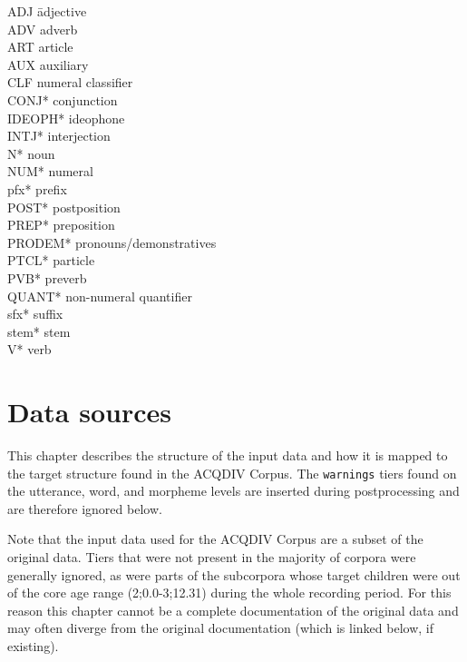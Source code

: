 \documentclass[a4paper, 11pt]{book}
\begin{document}
\begin{multicols}{2}
	\begin{tabbing}
	ADJ \hspace{2cm} \= adjective \\
	ADV \> adverb \\
	ART \> article \\
	AUX \> auxiliary \\
	CLF \> numeral classifier \\
	CONJ* \> conjunction \\
	IDEOPH* \> ideophone \\
	INTJ* \> interjection \\
	N* \> noun \\
	NUM* \> numeral \\
	pfx* \> prefix \\
	POST* \> postposition \\
	PREP* \> preposition \\
	PRODEM* \> pronouns/demonstratives \\
	PTCL* \> particle \\
	PVB* \> preverb \\
	QUANT* \> non-numeral quantifier \\
	sfx* \> suffix \\
	stem* \> stem \\
	V* \> verb \\
	\end{tabbing}
\end{multicols}


\chapter{Data sources}
\label{cha:Data sources}

This chapter describes the structure of the input data and how it is mapped to the target structure found in the ACQDIV Corpus. The \texttt{warnings} tiers found on the utterance, word, and morpheme levels are inserted during postprocessing and are therefore ignored below. 

Note that the input data used for the ACQDIV Corpus are a subset of the original data. Tiers that were not present in the majority of corpora were generally ignored, as were parts of the subcorpora whose target children were out of the core age range (2;0.0-3;12.31) during the whole recording period. For this reason this chapter cannot be a complete documentation of the original data and may often diverge from the original documentation (which is linked below, if existing).
\end{document}

